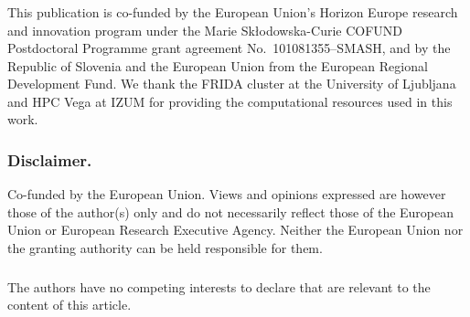 \documentclass[runningheads]{llncs}
\begin{document}
\begin{credits}
\subsubsection{\ackname} This publication is co-funded by the European Union's Horizon Europe research and innovation program under the Marie Sk\l{}odowska-Curie COFUND Postdoctoral Programme grant agreement No.~101081355--SMASH, and by the Republic of Slovenia and the European Union from the European Regional Development Fund. We thank the FRIDA cluster at the University of Ljubljana and HPC Vega at IZUM for providing the computational resources used in this work.

\subsubsection{Disclaimer.} Co-funded by the European Union. Views and opinions expressed are however those of the author(s) only and do not necessarily reflect those of the European Union or European Research Executive Agency. Neither the European Union nor the granting authority can be held responsible for them.

\subsubsection{\discintname} The authors have no competing interests to declare that are relevant to the content of this article.
\end{credits}



\end{document}
